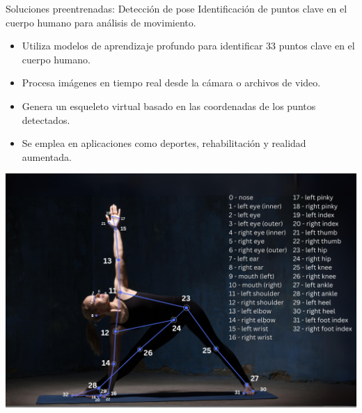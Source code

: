 \begin{frame}{Soluciones preentrenadas: Detección de pose }
    Identificación de puntos clave en el cuerpo humano para análisis de movimiento.
    \begin{itemize}
        \item Utiliza modelos de aprendizaje profundo para identificar 33 puntos clave en el cuerpo humano.
        \item Procesa imágenes en tiempo real desde la cámara o archivos de video.
        \item Genera un esqueleto virtual basado en las coordenadas de los puntos detectados.
        \item Se emplea en aplicaciones como deportes, rehabilitación y realidad aumentada.
    \end{itemize}    
    \begin{center}
        \includegraphics[width=0.6\linewidth]{01_MediaPipe/pose_landmarks.png}
    \end{center}
\end{frame}

